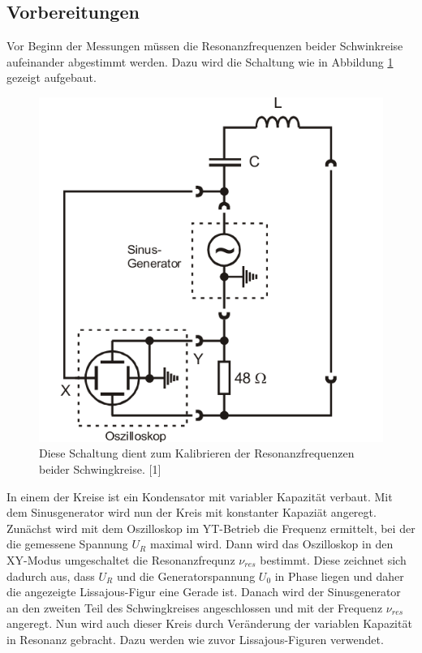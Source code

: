 \documentclass[11pt,ngerman,a4paper]{article}
\begin{document}
\subsection{Vorbereitungen}
Vor Beginn der Messungen müssen die Resonanzfrequenzen beider Schwinkreise aufeinander abgestimmt werden. Dazu wird die Schaltung wie in Abbildung \ref{abb1} gezeigt aufgebaut.
\begin{figure}[htp]
\centering
\includegraphics[scale=0.5]{Abb/abb1.png}
\caption{Diese Schaltung dient zum Kalibrieren der Resonanzfrequenzen beider Schwingkreise. [1]}
\label{abb1}
\end{figure}
In einem der Kreise ist ein Kondensator mit variabler Kapazität verbaut. Mit dem Sinusgenerator wird nun der Kreis mit konstanter Kapazi\"at angeregt. Zunächst wird mit dem Oszilloskop im YT-Betrieb die Frequenz ermittelt, bei der die gemessene Spannung $U_R$ maximal wird. Dann wird das Oszilloskop in den XY-Modus umgeschaltet die Resonanzfrequnz $\nu_{res}$ bestimmt. Diese zeichnet sich dadurch aus, dass $U_R$ und die Generatorspannung $U_0$ in Phase liegen und daher die angezeigte Lissajous-Figur eine Gerade ist. Danach wird der Sinusgenerator an den zweiten Teil des Schwingkreises angeschlossen und mit der Frequenz $\nu_{res}$ angeregt. Nun wird auch dieser Kreis durch Veränderung der variablen Kapazität in Resonanz gebracht. Dazu werden wie zuvor Lissajous-Figuren verwendet. 
\end{document}
